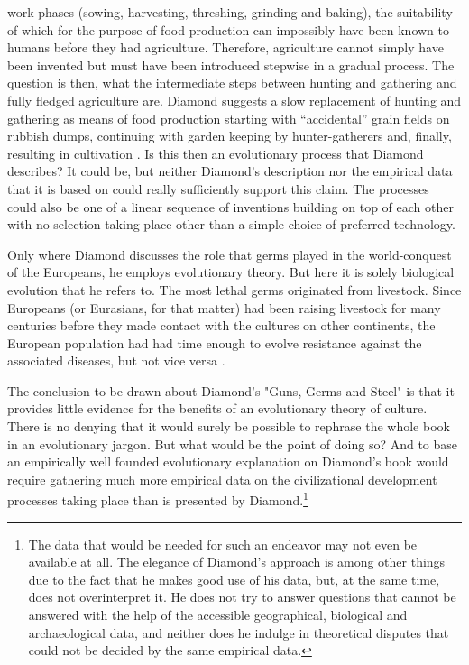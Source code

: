 work phases (sowing, harvesting, threshing, grinding and baking), the
suitability of which for the purpose of food production can impossibly
have been known to humans before they had agriculture. Therefore,
agriculture cannot simply have been invented but must have been
introduced stepwise in a gradual process. The question is then, what
the intermediate steps between hunting and gathering and fully fledged
agriculture are. Diamond suggests a slow replacement of hunting and
gathering as means of food production starting with ``accidental''
grain fields on rubbish dumps, continuing with garden keeping by
hunter-gatherers and, finally, resulting in cultivation
\cite[p.\ 104ff.]{diamond:1997}. Is this then an evolutionary process
that Diamond describes? It could be, but neither Diamond's description
nor the empirical data that it is based on could really sufficiently
support this claim.  The processes could also be one of a linear
sequence of inventions building on top of each other with no selection
taking place other than a simple choice of preferred technology. 

Only where Diamond discusses the role that germs played in the world-conquest
of the Europeans, he employs evolutionary theory. But here it is solely
biological evolution that he refers to. The most lethal germs originated from
livestock. Since Europeans (or Eurasians, for that matter) had been raising
livestock for many centuries before they made contact with the cultures on
other continents, the European population had had time enough to evolve
resistance against the associated diseases, but not vice versa
\cite[ch. 11]{diamond:1997}.

The conclusion to be drawn about Diamond's "Guns, Germs and Steel" is that it
provides little evidence for the benefits of an evolutionary
theory of culture. There is no denying that it would surely be possible to
rephrase the whole book in an evolutionary jargon.  But what would be the
point of doing so? And to base an empirically well founded evolutionary
explanation on Diamond's book would require gathering much more empirical data
on the civilizational development processes taking place than is presented by
Diamond.\footnote{The data that would be needed for such an endeavor may not even be
available at all. The elegance of Diamond's approach is among other things due
to the fact that he makes good use of his data, but, at the same time, does
not overinterpret it.  He does not try to answer questions that cannot be
answered with the help of the accessible geographical, biological and
archaeological data, and neither does he indulge in theoretical disputes that
could not be decided by the same empirical data.}


